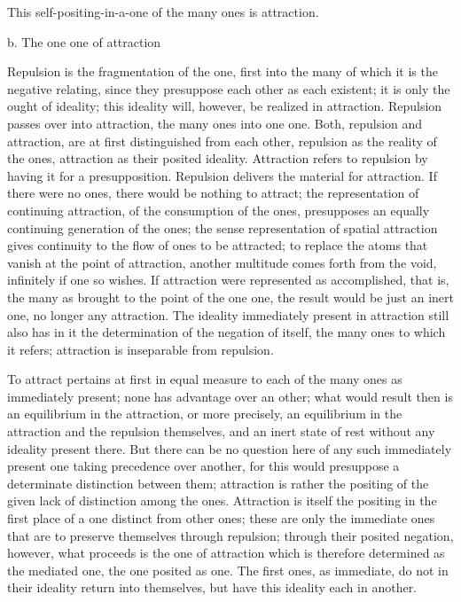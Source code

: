 This self-positing-in-a-one of the many ones is attraction.

b. The one one of attraction

Repulsion is the fragmentation of the one,
first into the many of which
it is the negative relating,
since they presuppose each other as each existent;
it is only the ought of ideality;
this ideality will, however, be realized in attraction.
Repulsion passes over into attraction,
the many ones into one one.
Both, repulsion and attraction, are
at first distinguished from each other,
repulsion as the reality of the ones,
attraction as their posited ideality.
Attraction refers to repulsion
by having it for a presupposition.
Repulsion delivers the material for attraction.
If there were no ones,
there would be nothing to attract;
the representation of continuing attraction,
of the consumption of the ones,
presupposes an equally continuing generation of the ones;
the sense representation of spatial attraction
gives continuity to the flow of ones to be attracted;
to replace the atoms that vanish at the point of attraction,
another multitude comes forth from the void,
infinitely if one so wishes.
If attraction were represented as accomplished, that is,
the many as brought to the point of the one one,
the result would be just an inert one, no longer any attraction.
The ideality immediately present in attraction
still also has in it the determination of the negation of itself,
the many ones to which it refers;
attraction is inseparable from repulsion.

To attract pertains at first in equal measure
to each of the many ones as immediately present;
none has advantage over an other;
what would result then is an equilibrium in the attraction,
or more precisely, an equilibrium in the attraction
and the repulsion themselves, and an inert state of rest
without any ideality present there.
But there can be no question here of
any such immediately present one taking precedence over another,
for this would presuppose a determinate distinction between them;
attraction is rather the positing of
the given lack of distinction among the ones.
Attraction is itself the positing in the first place
of a one distinct from other ones;
these are only the immediate ones
that are to preserve themselves through repulsion;
through their posited negation, however, what proceeds
is the one of attraction
which is therefore determined as the mediated one,
the one posited as one.
The first ones, as immediate, do not in their ideality
return into themselves,
but have this ideality each in another.


